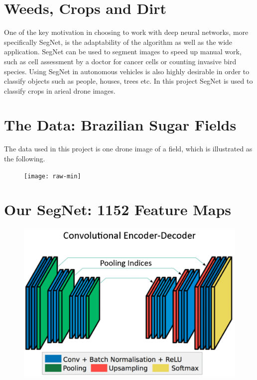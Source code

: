\documentclass[
]{dtuposter}
\begin{document}
%
%
\begin{dtuposterhead} %
\end{dtuposterhead}
%
%
\begin{dtupostercontent}
\section{Weeds, Crops and Dirt}
 One of the key motivation in choosing to work with deep neural networks, more specifically
 SegNet, is the adaptability of the algorithm as well as the wide application. SegNet can be
 used to segment images to speed up manual work, such as cell assessment by a doctor for
 cancer cells or counting invasive bird species. Using SegNet in autonomous vehicles is also
 highly desirable in order to classify objects such as people, houses, trees etc. In this project SegNet is used to classify crops in arieal drone images. 
 
\section{The Data: Brazilian Sugar Fields}
The data used in this project is one drone image of a field, which is illustrated as the following.
\begin{figure}
\centering
\texttt{[image: raw-min]}
\end{figure}


\section{Our SegNet: 1152 Feature Maps}


\begin{figure}
	\centering
	\includegraphics[width=0.8\linewidth]{Structure}
	\caption{}
	\label{fig:Structure}
\end{figure}


\end{dtupostercontent}
\end{document}
